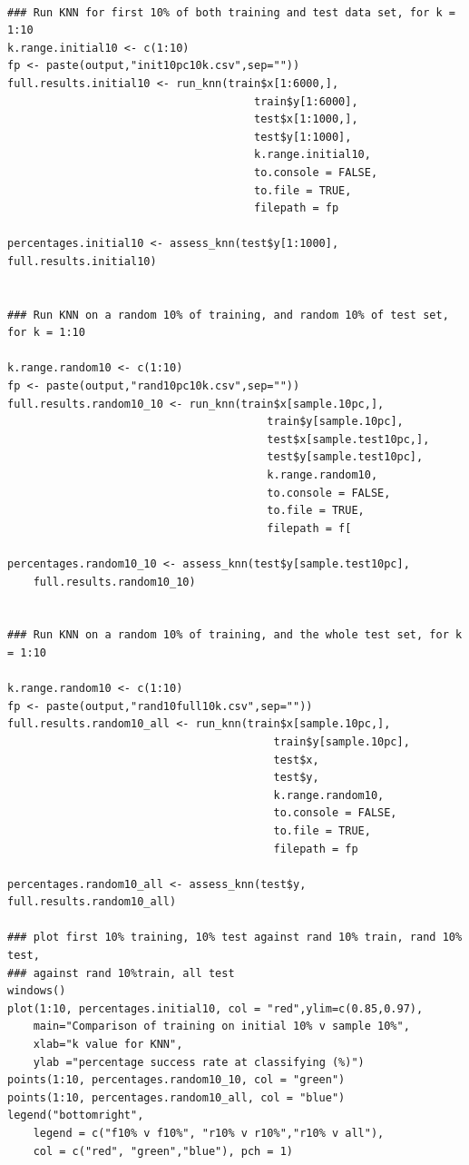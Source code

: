 \documentclass[11pt]{article} %
\begin{document}
\begin{lstlisting}

### Run KNN for first 10% of both training and test data set, for k = 1:10
k.range.initial10 <- c(1:10)
fp <- paste(output,"init10pc10k.csv",sep=""))
full.results.initial10 <- run_knn(train$x[1:6000,], 
                                      train$y[1:6000], 
                                      test$x[1:1000,], 
                                      test$y[1:1000], 
                                      k.range.initial10,
                                      to.console = FALSE,
                                      to.file = TRUE,
                                      filepath = fp

percentages.initial10 <- assess_knn(test$y[1:1000], full.results.initial10)


### Run KNN on a random 10% of training, and random 10% of test set, for k = 1:10

k.range.random10 <- c(1:10)
fp <- paste(output,"rand10pc10k.csv",sep=""))
full.results.random10_10 <- run_knn(train$x[sample.10pc,], 
                                        train$y[sample.10pc], 
                                        test$x[sample.test10pc,], 
                                        test$y[sample.test10pc], 
                                        k.range.random10,
                                        to.console = FALSE,
                                        to.file = TRUE,
                                        filepath = f[

percentages.random10_10 <- assess_knn(test$y[sample.test10pc], 
	full.results.random10_10)


### Run KNN on a random 10% of training, and the whole test set, for k = 1:10

k.range.random10 <- c(1:10)
fp <- paste(output,"rand10full10k.csv",sep=""))
full.results.random10_all <- run_knn(train$x[sample.10pc,], 
                                         train$y[sample.10pc], 
                                         test$x, 
                                         test$y, 
                                         k.range.random10,
                                         to.console = FALSE,
                                         to.file = TRUE,
                                         filepath = fp

percentages.random10_all <- assess_knn(test$y, full.results.random10_all)

### plot first 10% training, 10% test against rand 10% train, rand 10% test, 
### against rand 10%train, all test 
windows()
plot(1:10, percentages.initial10, col = "red",ylim=c(0.85,0.97),
	main="Comparison of training on initial 10% v sample 10%", 
	xlab="k value for KNN", 
	ylab ="percentage success rate at classifying (%)")
points(1:10, percentages.random10_10, col = "green")
points(1:10, percentages.random10_all, col = "blue")
legend("bottomright", 
	legend = c("f10% v f10%", "r10% v r10%","r10% v all"), 
	col = c("red", "green","blue"), pch = 1)


\end{lstlisting}
\vspace{15mm}
\end{document}
